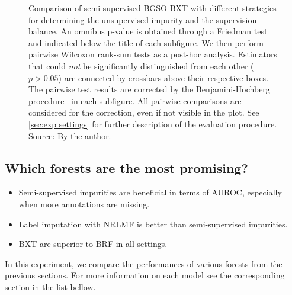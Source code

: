 \begin{figure}[tb]
    \caption{
        Comparison of semi-supervised BGSO BXT with different strategies for determining the unsupervised impurity and the supervision balance.
        An omnibus p-value is obtained through a Friedman test and indicated below the title of each subfigure.
        We then perform pairwise Wilcoxon rank-sum tests as a post-hoc analysis.
        Estimators that could \emph{not} be significantly distinguished from each other ($p > 0.05$) are connected by crossbars above their respective boxes. 
        The pairwise test results are corrected by the Benjamini-Hochberg procedure~\cite{benjamini1995controlling,haynes2013benjamini} in each subfigure. All pairwise comparisons are considered for the correction, even if not visible in the plot.
        See \autoref{sec:exp settings} for further description of the evaluation procedure. \newline Source: By the author.
    }
    \label{fig:ss_comparison}
\end{figure}


\subsection{Which forests are the most promising?}
\label{sec:best_forests}

\begin{mdframed}[frametitle={Key findings}]
    \begin{itemize}
        \item Semi-supervised impurities are beneficial in terms of AUROC, especially when more annotations are missing.  %
        \item Label imputation with NRLMF is better than semi-supervised impurities.
        \item BXT are superior to BRF in all settings.
    \end{itemize}
\end{mdframed}

In this experiment, we compare the performances of various forests from the previous sections.
For more information on each model see the corresponding section in the list bellow.

